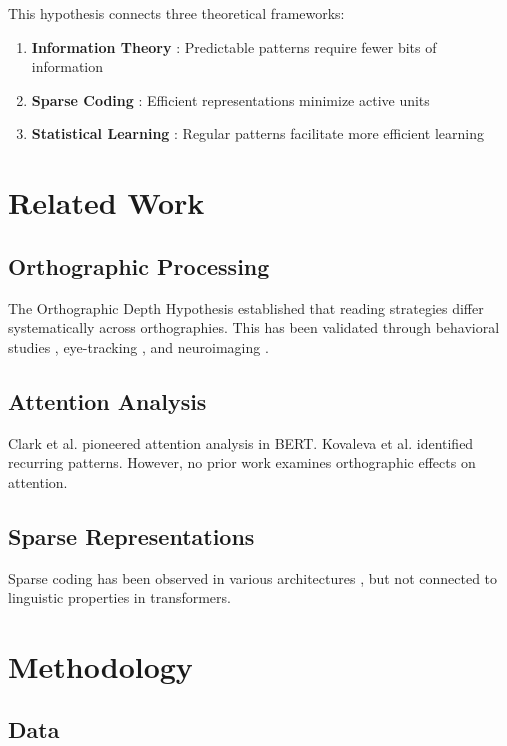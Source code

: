 \documentclass[11pt,a4paper]{article}
\begin{document}
This hypothesis connects three theoretical frameworks:
\begin{enumerate}
    \item \textbf{Information Theory} \cite{shannon1948}: Predictable patterns require fewer bits of information
    \item \textbf{Sparse Coding} \cite{olshausen1996}: Efficient representations minimize active units
    \item \textbf{Statistical Learning} \cite{frost2012}: Regular patterns facilitate more efficient learning
\end{enumerate}

\section{Related Work}

\subsection{Orthographic Processing}

The Orthographic Depth Hypothesis \cite{katz1992} established that reading strategies differ systematically across orthographies. This has been validated through behavioral studies \cite{seymour2003}, eye-tracking \cite{frost1998}, and neuroimaging \cite{paulesu2000}.

\subsection{Attention Analysis}

Clark et al. \cite{clark2019} pioneered attention analysis in BERT. Kovaleva et al. \cite{kovaleva2019} identified recurring patterns. However, no prior work examines orthographic effects on attention.

\subsection{Sparse Representations}

Sparse coding \cite{olshausen1996} has been observed in various architectures \cite{ranzato2008}, but not connected to linguistic properties in transformers.

\section{Methodology}

\subsection{Data}
\end{document}
